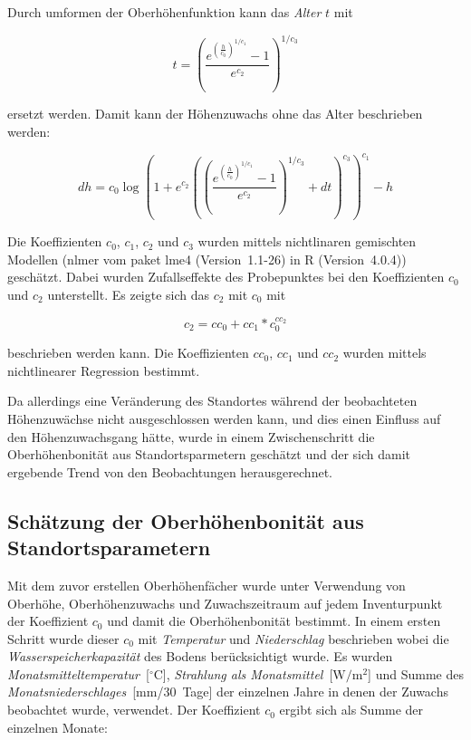\documentclass[twocolumn]{scrartcl}
\begin{document}
Durch umformen der Oberhöhenfunktion kann das \emph{Alter} $t$ mit

\begin{equation}
  \label{eq:ohFunT}
  t = \left(\frac{e^{\left(\frac{h}{c_0}\right)^{1/c_1}} - 1}{e^{c_2}}\right)^{1/c_3}
\end{equation}

ersetzt werden. Damit kann der Höhenzuwachs ohne das Alter beschrieben werden:

\begin{equation}
  \label{eq:ohFunDh}
  dh = c_0 \log\left(1 + e^{c_2}\left(\left(\frac{e^{\left(\frac{h}{c_0}\right)^{1/c_1}} - 1}{e^{c_2}}\right)^{1/c_3} + dt\right)^{c_3}\right)^{c_1} - h
\end{equation}

Die Koeffizienten $c_0$, $c_1$, $c_2$ und $c_3$ wurden mittels
nichtlinaren gemischten Modellen (nlmer vom paket lme4
(Version~1.1-26) in R (Version~4.0.4)) geschätzt. Dabei wurden
Zufallseffekte des Probepunktes bei den Koeffizienten $c_0$ und $c_2$
unterstellt. Es zeigte sich das $c_2$ mit $c_0$ mit

\begin{equation}
  \label{eq:ohFunC2}
  c_2 = cc_0 + cc_1 * c_0^{cc_2}
\end{equation}

beschrieben werden kann. Die Koeffizienten $cc_0$, $cc_1$ und $cc_2$
wurden mittels nichtlinearer Regression bestimmt.

Da allerdings eine Veränderung des Standortes während der beobachteten
Höhenzuwächse nicht ausgeschlossen werden kann, und dies einen
Einfluss auf den Höhenzuwachsgang hätte, wurde in einem
Zwischenschritt die Oberhöhenbonität aus Standortsparmetern geschätzt
und der sich damit ergebende Trend von den Beobachtungen
herausgerechnet.

\subsection{Schätzung der Oberhöhenbonität aus Standortsparametern}

Mit dem zuvor erstellen Oberhöhenfächer wurde unter Verwendung von
Oberhöhe, Oberhöhenzuwachs und Zuwachszeitraum auf jedem Inventurpunkt
der Koeffizient $c_0$ und damit die Oberhöhenbonität bestimmt. In
einem ersten Schritt wurde dieser $c_0$ mit \emph{Temperatur} und
\emph{Niederschlag} beschrieben wobei die
\emph{Wasserspeicherkapazität} des Bodens berücksichtigt wurde. Es
wurden \emph{Monatsmitteltemperatur}~[$^{\circ}$C], \emph{Strahlung als
  Monatsmittel}~[$\text{W}/\text{m}^2$] und Summe des
\emph{Monatsniederschlages}~[mm/30~Tage] der einzelnen Jahre in denen
der Zuwachs beobachtet wurde, verwendet.
Der Koeffizient $c_0$ ergibt sich als Summe der einzelnen Monate:
\end{document}
